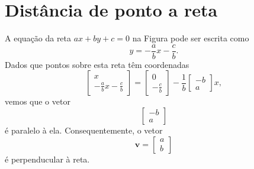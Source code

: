 %
%
%

\section{Distância de ponto a reta} \label{sse:point2line}
A equação da reta $ax+by+c=0$ na Figura pode ser escrita como
\begin{equation*}
y=-\frac{a}{b}x-\frac{c}{b}.
\end{equation*}
Dados que pontos sobre esta reta têm coordenadas
\begin{equation*}
\left[ \begin{array}{c} x \\ -\frac{a}{b}x-\frac{c}{b} \end{array} \right] =
\left[ \begin{array}{c} 0 \\ -\frac{c}{b} \end{array} \right] -\frac{1}{b}
\left[ \begin{array}{c} -b \\ a \end{array} \right]x,
\end{equation*}
vemos que o vetor
\begin{equation*}
\left[ \begin{array}{c} -b \\ a \end{array} \right]
\end{equation*}
é paralelo à ela. Consequentemente, o vetor
\begin{equation*}
\textbf{v}=\left[ \begin{array}{c} a\\ b \end{array} \right]
\end{equation*}
é perpenducular à reta.

